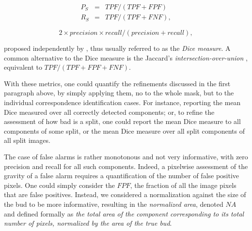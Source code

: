 \documentclass[a4paper,authoryear,review]{elsarticle}
\begin{document}
	\begin{eqnarray*} 
		P_S &=& TPF / (TPF + FPF) \\
		R_S &=& TPF / (TPF + FNF),
	\end{eqnarray*}
	
	\begin{equation} 
	2 \times precision \times recall / (precision + recall),
	\end{equation}
	
	proposed independently by \citet{dice1945measures}, thus usually referred to as the \emph{Dice measure}. A common alternative to the Dice measure is the  Jaccard’s \emph{intersection-over-union} \citep{jaccard1912distribution}, 
	equivalent to $TPF / (TPF+FPF+FNF)$. 
	
	With these metrics, one could quantify the refinements discussed in the first paragraph above, by simply applying them, no to the whole mask, but to the individual correspondence identification cases. For instance, reporting the mean Dice measured over all correctly detected components; or, to refine the assessment of how bad is a split, one could report the mean Dice measure to all components of some split, or the mean Dice measure over all split components of all split images. 
	
	The case of false alarms is rather monotonous and not very informative, with zero precision and recall for all such components. Indeed, a pixelwise assessment of the gravity of a false alarm requires a quantification of the number of false positive pixels. One could simply consider the $FPF$, the fraction of all the image pixels that are false positives. Instead, we considered a normalization against the size of the bud to be more informative, resulting in the \emph{normalized area}, denoted $NA$ and defined formally as  \emph{the total area of the component corresponding to its total number of pixels, normalized by the area of the true bud}. 
	
	
\end{document}
